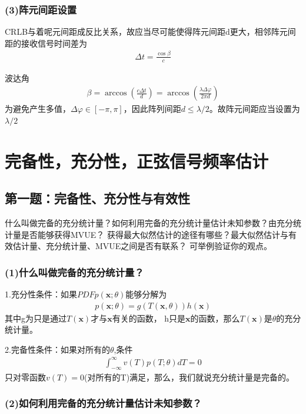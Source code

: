 \documentclass[fontset=windows]{article}
\numberwithin{figure}{section}
\begin{document}
\subsubsection*{(3)阵元间距设置}

CRLB与着呢元间距成反比关系，故应当尽可能使得阵元间距d更大，相邻阵元间距的接收信号时间差为
\begin{align*}
	\Delta t=\frac{\cos \beta}{c}
\end{align*}

波达角\begin{align*}
	\beta=\arccos \left(\frac{c\Delta t}{d}\right)=\arccos\left(\frac{\lambda\Delta\varphi}{2\pi d}\right)
\end{align*}
为避免产生多值，\(\Delta\varphi\in [-\pi, \pi]\)，因此阵列间距\(d\leq \lambda/2\)。故阵元间距应当设置为\(\lambda/2\)

\section{完备性，充分性，正弦信号频率估计}

\subsection{第一题：完备性、充分性与有效性}
什么叫做完备的充分统计量？如何利用完备的充分统计量估计未知参数？由充分统计量是否能够获得MVUE？
获得最大似然估计的途径有哪些？最大似然估计与有效估计量、充分统计量、MVUE之间是否有联系？
可举例验证你的观点。

\subsubsection*{(1)什么叫做完备的充分统计量？}

1.充分性条件：如果\(PDFp(\mathbf{x};\theta)\)能够分解为
\begin{align*}
	p(\mathbf{x};\theta)=g(T(\mathbf{x},\theta))h(\mathbf{x})
\end{align*}
其中g为只是通过\(T(\mathbf{x})\)才与\(\mathbf{x}\)有关的函数，
h只是\(\mathbf{x}\)的函数，那么\(T(\mathbf{x})\)是\(\theta\)的充分统计量。

2.完备性条件：如果对所有的\(\theta\),条件
\begin{align*}
	\int_{-\infty}^{\infty} v(T)p(T;\theta)dT=0
\end{align*}
只对零函数\(v(T)=0\)(对所有的T)满足，那么，我们就说充分统计量是完备的。

\subsubsection*{(2)如何利用完备的充分统计量估计未知参数？}
\end{document}
